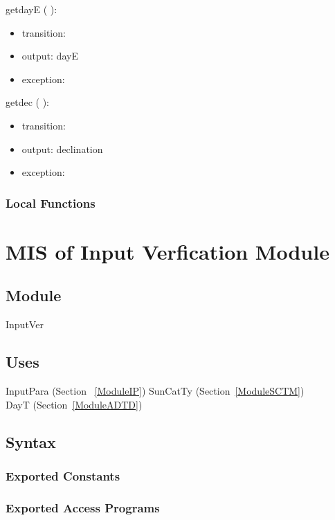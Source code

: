 \documentclass[12pt, titlepage]{article}
\begin{document}
\noindent  getdayE ( ):
\begin{itemize}
\item transition: 
\item output: dayE
\item exception: 
\end{itemize}

\noindent  getdec ( ):
\begin{itemize}
\item transition: 
\item output: declination
\item exception: 
\end{itemize}

\subsubsection{Local Functions}



\newpage



\section{MIS of Input Verfication Module} \label{ModuleIV} 

\subsection{Module}
InputVer

\subsection{Uses}
InputPara (Section ~\ref{ModuleIP})
SunCatTy (Section~\ref{ModuleSCTM}) \\
DayT (Section~\ref{ModuleADTD}) \\

\subsection{Syntax}

\subsubsection{Exported Constants}


\subsubsection{Exported Access Programs}
\end{document}

